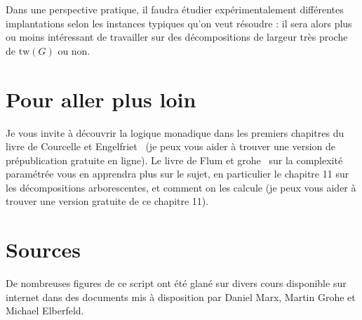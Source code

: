 \documentclass[a4paper,12pt]{article}
\theoremstyle{definition}
\theoremstyle{remark}
\newcommand{\tw}[1]{\ensuremath{\mathrm{tw}(#1)}}
\begin{document}
Dans une perspective pratique, il faudra étudier expérimentalement
différentes implantations selon les instances typiques qu'on veut
résoudre : il sera alors plus ou moins intéressant de travailler sur
des décompositions de largeur très proche de $\tw{G}$ ou non.

\section{Pour aller plus loin}
Je vous invite à découvrir la logique monadique dans les premiers
chapitres du livre de Courcelle et Engelfriet~\cite{DBLP:books/daglib/0030804} (je peux vous aider à trouver une version de prépublication
gratuite en ligne). Le livre de Flum et grohe~\cite{FlumGrohe2006} sur
la complexité paramétrée vous en apprendra plus sur le sujet, en
particulier le chapitre 11 sur les décompositions arborescentes, et
comment on les calcule (je peux vous aider à trouver une version
gratuite de ce chapitre 11).

\nocite{*}



\section*{Sources}
De nombreuses figures de ce script ont été glané sur divers cours
disponible sur internet dans des documents mis à disposition par Daniel Marx,
Martin Grohe et Michael Elberfeld.
\end{document}
